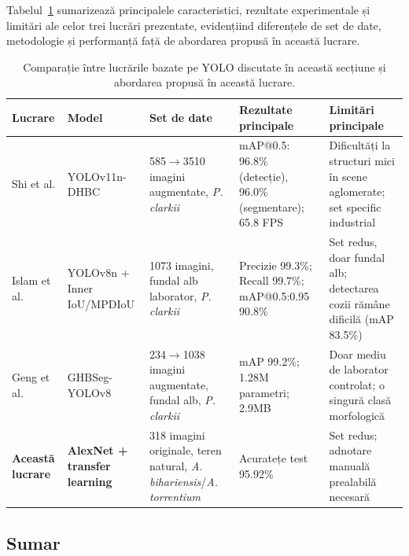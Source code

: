 Tabelul~\ref{tab:comparatie_yolo} sumarizează principalele caracteristici, rezultate experimentale și limitări ale celor trei lucrări prezentate, evidențiind diferențele de set de date, metodologie și performanță față de abordarea propusă în această lucrare.

\begin{table}[H]
\centering
\caption{Comparație între lucrările bazate pe YOLO discutate în
această secțiune și abordarea propusă în această lucrare.}
\label{tab:comparatie_yolo}
\begin{tabular}{p{1.6cm}p{1.9cm}p{2.2cm}p{2.4cm}p{2.7cm}}
\hline
\textbf{Lucrare} & \textbf{Model} & \textbf{Set de date} &
\textbf{Rezultate principale} & \textbf{Limitări principale} \\
\hline
Shi et al. \cite{Lightweight_detection_and_segmentation_of_crayfish_parts_using_an_improved_YOLOv11n_segmentation_model} &
YOLOv11n-DHBC &
585$\rightarrow$3510 imagini augmentate, \textit{P. clarkii} &
mAP@0.5: 96.8\% (detecție), 96.0\% (segmentare); 65.8 FPS &
Dificultăți la structuri mici în scene aglomerate; set specific industrial \\
\hline
Islam et al. \cite{Identification_Algorithm_of_Crayfish_Body_Features_Based_on_the_Improved_YOLOv8n_Loss_Function} &
YOLOv8n + Inner IoU/MPDIoU &
1073 imagini, fundal alb laborator, \textit{P. clarkii} &
Precizie 99.3\%; Recall 99.7\%; mAP@0.5:0.95 90.8\% &
Set redus, doar fundal alb; detectarea cozii rămâne dificilă (mAP 83.5\%) \\
\hline
Geng et al. \cite{Application_of_Improved_YOLOv8n-seg_in_Crayfish_Trunk_Segmentation} &
GHBSeg-YOLOv8 &
234$\rightarrow$1038 imagini augmentate, fundal alb, \textit{P. clarkii} &
mAP 99.2\%; 1.28M parametri; 2.9MB &
Doar mediu de laborator controlat; o singură clasă morfologică \\
\hline
\textbf{Această lucrare} &
\textbf{AlexNet + transfer learning} &
318 imagini originale, teren natural, \textit{A. bihariensis}/\textit{A. torrentium} &
Acuratețe test 95.92\% &
Set redus; adnotare manuală prealabilă necesară \\
\hline
\end{tabular}
\end{table}


\subsection{Sumar}

